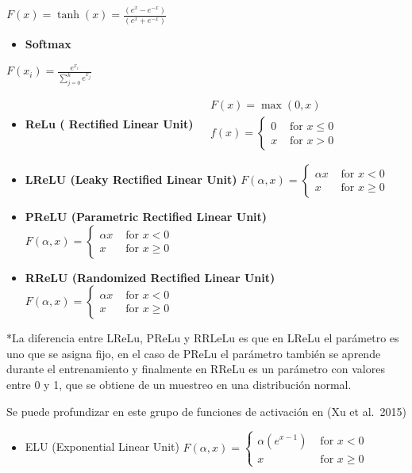 \documentclass[
  a4paper,
  DIV=11,
  numbers=noendperiod]{scrreprt}
\providecommand{\tightlist}{%
  \setlength{\itemsep}{0pt}\setlength{\parskip}{0pt}}\usepackage{longtable,booktabs,array}
\begin{document}
\(F(x)=\tanh (x)=\frac{\left(e^x-e^{-x}\right)}{\left(e^x+e^{-x}\right)}\)

\begin{itemize}
\tightlist
\item
  \textbf{Softmax}
\end{itemize}

\(F\left(x_i\right)=\frac{e^{x_i}}{\sum_{j=0}^k e^{x_j}}\)

\begin{itemize}
\item
  \textbf{ReLu ( Rectified Linear Unit)}
  \(\begin{aligned} & F(x)=\max (0, x) \\ & f(x)= \begin{cases}0 & \text { for } x \leq 0 \\ x & \text { for } x>0\end{cases} \end{aligned}\)
\item
  \textbf{LReLU (Leaky Rectified Linear Unit)}
  \(F(\alpha, x)= \begin{cases}\alpha x & \text { for } x<0 \\ x & \text { for } x \geq 0\end{cases}\)
\item
  \textbf{PReLU (Parametric Rectified Linear Unit)}
  \(F(\alpha, x)= \begin{cases}\alpha x & \text { for } x<0 \\ x & \text { for } x \geq 0\end{cases}\)
\item
  \textbf{RReLU (Randomized Rectified Linear Unit)}
  \(F(\alpha, x)= \begin{cases}\alpha x & \text { for } x<0 \\ x & \text { for } x \geq 0\end{cases}\)
\end{itemize}

*La diferencia entre LReLu, PReLu y RRLeLu es que en LReLu el parámetro
es uno que se asigna fijo, en el caso de PReLu el parámetro también se
aprende durante el entrenamiento y finalmente en RReLu es un parámetro
con valores entre 0 y 1, que se obtiene de un muestreo en una
distribución normal.

Se puede profundizar en este grupo de funciones de activación en (Xu et
al.~2015)

\begin{itemize}
\tightlist
\item
  ELU (Exponential Linear Unit)
  \(F(\alpha, x)= \begin{cases}\alpha\left(e^{x-1}\right) & \text { for } x<0 \\ x & \text { for } x \geq 0\end{cases}\)
\end{itemize}
\end{document}
